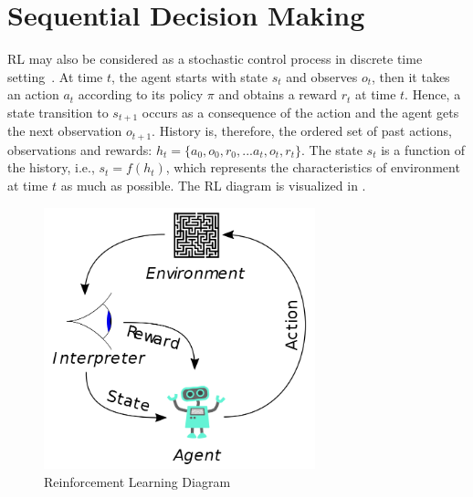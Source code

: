 \section{Sequential Decision Making}
\label{sec:decision_making}

RL may also be considered as a stochastic control process in discrete time setting~\cite{sutton_reinforcement_1998}. 
At time $t$, the agent starts with state $s_t$ and observes $o_t$, 
then it takes an action $a_t$ according to its policy $\pi$ and obtains a reward $r_t$ at time $t$. 
Hence, a state transition to $s_{t+1}$ occurs as a consequence of the action and the agent gets the next observation $o_{t+1}$. 
History is, therefore, the ordered set of past actions, observations and rewards: $h_t=\{ a_0, o_0, r_0, ... a_t, o_t, r_t\}$. 
The state $s_t$ is a function of the history, i.e., $s_t=f(h_t)$, 
which represents the characteristics of environment at time $t$ as much as possible. 
The RL diagram is visualized in . 
\begin{figure}
	\centering
	\includegraphics[width=0.7\textwidth]{figures/ml_theory/RL_diagram.png}
	\caption{Reinforcement Learning Diagram}
	\label{fig:rl_diagram}
\end{figure}